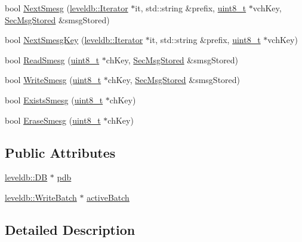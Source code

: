 \begin{DoxyCompactItemize}
bool \hyperlink{class_sec_msg_d_b_ac16426690cd634af83b90aa39a7a5d51}{Next\+Smesg} (\hyperlink{classleveldb_1_1_iterator}{leveldb\+::\+Iterator} $\ast$it, std\+::string \&prefix, \hyperlink{stdint_8h_aba7bc1797add20fe3efdf37ced1182c5}{uint8\+\_\+t} $\ast$vch\+Key, \hyperlink{class_sec_msg_stored}{Sec\+Msg\+Stored} \&smsg\+Stored)
\item 
bool \hyperlink{class_sec_msg_d_b_a6aa8320d9850912374a74823024df701}{Next\+Smesg\+Key} (\hyperlink{classleveldb_1_1_iterator}{leveldb\+::\+Iterator} $\ast$it, std\+::string \&prefix, \hyperlink{stdint_8h_aba7bc1797add20fe3efdf37ced1182c5}{uint8\+\_\+t} $\ast$vch\+Key)
\item 
bool \hyperlink{class_sec_msg_d_b_a35c86d596ed6c60f4d62cc3e551356d2}{Read\+Smesg} (\hyperlink{stdint_8h_aba7bc1797add20fe3efdf37ced1182c5}{uint8\+\_\+t} $\ast$ch\+Key, \hyperlink{class_sec_msg_stored}{Sec\+Msg\+Stored} \&smsg\+Stored)
\item 
bool \hyperlink{class_sec_msg_d_b_af254b80ad938946841361c77cb09be0a}{Write\+Smesg} (\hyperlink{stdint_8h_aba7bc1797add20fe3efdf37ced1182c5}{uint8\+\_\+t} $\ast$ch\+Key, \hyperlink{class_sec_msg_stored}{Sec\+Msg\+Stored} \&smsg\+Stored)
\item 
bool \hyperlink{class_sec_msg_d_b_ad9869377019ded94b70a3c4a9ba2afb0}{Exists\+Smesg} (\hyperlink{stdint_8h_aba7bc1797add20fe3efdf37ced1182c5}{uint8\+\_\+t} $\ast$ch\+Key)
\item 
bool \hyperlink{class_sec_msg_d_b_a7d00fef57cf02d33e0b076ca114f7af5}{Erase\+Smesg} (\hyperlink{stdint_8h_aba7bc1797add20fe3efdf37ced1182c5}{uint8\+\_\+t} $\ast$ch\+Key)
\end{DoxyCompactItemize}
\subsection*{Public Attributes}
\begin{DoxyCompactItemize}
\item 
\hyperlink{classleveldb_1_1_d_b}{leveldb\+::\+D\+B} $\ast$ \hyperlink{class_sec_msg_d_b_a3715bf85e5e420c6c3ec5335bec80ed0}{pdb}
\item 
\hyperlink{classleveldb_1_1_write_batch}{leveldb\+::\+Write\+Batch} $\ast$ \hyperlink{class_sec_msg_d_b_add6d2066ed0af0b4fcaef2739663e2c4}{active\+Batch}
\end{DoxyCompactItemize}


\subsection{Detailed Description}


